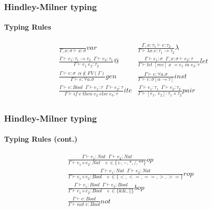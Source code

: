 \documentclass[xcolor=table]{beamer}
\begin{document}
\begin{frame}
\frametitle{Hindley-Milner typing}
\framesubtitle{Typing Rules}
\begin{block}{}
\begin{small}
\begin{align*}
& \frac{}{\Gamma , x: \sigma \vdash x:\sigma }var  
& \frac{\Gamma, x:\tau_1 \vdash e:\tau_2}{\Gamma \vdash \lambda x. e:\tau_1 \rightarrow \tau_2}\lambda \\[0.3cm]
& \frac{\Gamma \vdash e_1:\tau_1\rightarrow\tau_2 \;\; \Gamma \vdash e_2:\tau_1}{\Gamma \vdash e_1 \; e_2:\tau_2 }@ 
& \frac{\Gamma \vdash e_1:\sigma \;\;\Gamma, x:\sigma \vdash e_2:\tau}{\Gamma \vdash let \; [rec] \; x \; = e_1 \; in \; e_2:\tau }let \\[0.3cm]
& \frac{\Gamma \vdash e: \sigma \;\; \alpha \not \in FV(\Gamma)}{\Gamma \vdash e: \forall a. \sigma }gen 
& \frac{\Gamma \vdash e: \forall a. \sigma }{\Gamma \vdash e:\sigma [\alpha \rightarrow \tau ] }inst \\[0.3cm]
& \frac{\Gamma \vdash e : Bool \;\; \Gamma \vdash e_1:\tau \;\; \Gamma \vdash e_2:\tau}{\Gamma \vdash if \; e \; then \; e_2 \; else \;e_3 : \tau}ite
& \frac{\Gamma \vdash e_1:\tau_1 \;\; \Gamma \vdash e_2:\tau_2}{\Gamma \vdash [e_1, \; e_2]:\tau_1\times \tau_2  }pair \\[0.3cm]
\end{align*}
\end{small}
\end{block} 
\end{frame} 

\begin{frame}
\frametitle{Hindley-Milner typing}
\framesubtitle{Typing Rules (cont.)}
\begin{block}{}
\begin{small}
 \begin{gather*}
 \frac{\Gamma \vdash e_1 : Nat \;\; \Gamma \vdash e_2: Nat }{\Gamma \vdash e_1 \diamond e_2: Nat \;\;\; \diamond \in \lbrace +, -, *, /, **\rbrace}op \\[0.3cm]
 \frac{\Gamma \vdash e_1 : Nat \;\; \Gamma \vdash e_2: Nat }{\Gamma \vdash e_1 \diamond e_2: Bool \;\;\; \diamond \in \lbrace <, <=,==,>,>=\rbrace}rop \\[0.3cm]
 \frac{\Gamma \vdash e_1 : Bool \;\; \Gamma \vdash e_2: Bool }{\Gamma \vdash e_1 \diamond e_2: Bool \;\;\; \diamond \in \lbrace \&\&, || \rbrace }bop \\[0.3cm]
 \frac{\Gamma \vdash e : Bool }{\Gamma \vdash not \; e: Bool}not \\
\end{gather*}
\end{small}
\end{block} 
\end{frame} 
\end{document}
